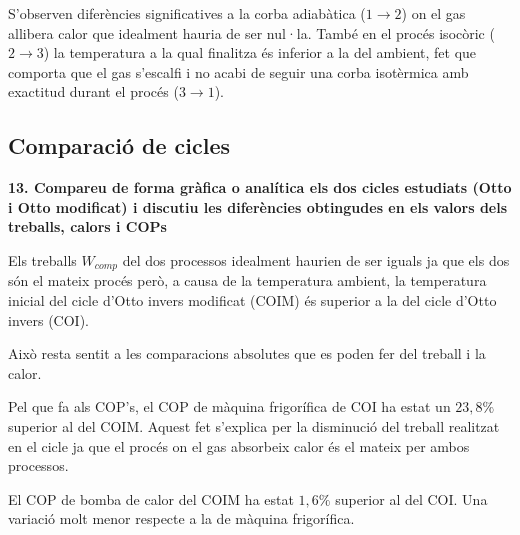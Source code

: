 \documentclass[a4paper]{article}
\begin{document}
S’observen diferències significatives a la corba adiabàtica ($1 \rightarrow 2$) on el gas allibera calor que idealment hauria de ser nul·la. També en el procés isocòric ($2\rightarrow3$) la temperatura a la qual finalitza és inferior a la del ambient, fet que comporta que el gas s’escalfi i no acabi de seguir una corba isotèrmica amb exactitud durant el procés ($3\rightarrow1$).

\subsection*{Comparació de cicles}	

\textbf{13. Compareu de forma gràfica o analítica els dos cicles estudiats (Otto i Otto modificat) i discutiu les diferències obtingudes en els valors dels treballs, calors i COPs}

\begin{figure}[H]
    \centering
\end{figure}

Els treballs $W_{comp}$ del dos processos idealment haurien de ser iguals ja que els dos són el mateix procés però, a causa de la temperatura ambient, la temperatura inicial del cicle d’Otto invers modificat (COIM) és superior a la del cicle d’Otto invers (COI).

Això resta sentit a les comparacions absolutes que es poden fer del treball i la calor.

Pel que fa als COP’s, el COP de màquina frigorífica de COI ha estat un $23,8\%$ superior al del COIM. Aquest fet s’explica per la disminució del treball realitzat en el cicle ja que el procés on  el gas absorbeix calor és el mateix per ambos processos.

El COP de bomba de calor del COIM ha estat $1,6\%$ superior al del COI. Una variació molt menor respecte a la de màquina frigorífica.
\end{document}
